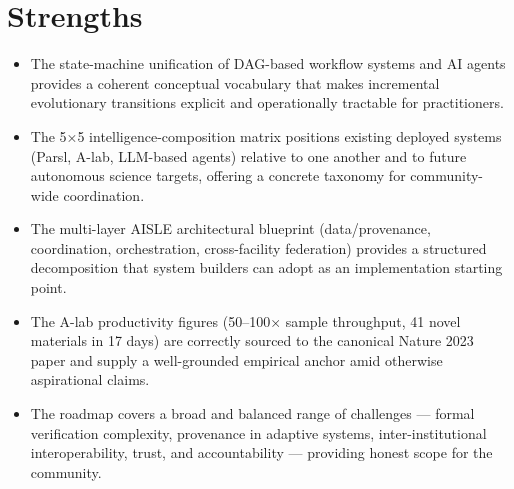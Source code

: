 \documentclass[11pt]{article}
\begin{document}
\section*{Strengths}
\begin{itemize}[leftmargin=*]
  \item The state-machine unification of DAG-based workflow systems and AI agents provides a coherent conceptual vocabulary that makes incremental evolutionary transitions explicit and operationally tractable for practitioners.
  \item The 5×5 intelligence-composition matrix positions existing deployed systems (Parsl, A-lab, LLM-based agents) relative to one another and to future autonomous science targets, offering a concrete taxonomy for community-wide coordination.
  \item The multi-layer AISLE architectural blueprint (data/provenance, coordination, orchestration, cross-facility federation) provides a structured decomposition that system builders can adopt as an implementation starting point.
  \item The A-lab productivity figures (50–100× sample throughput, 41 novel materials in 17 days) are correctly sourced to the canonical Nature 2023 paper and supply a well-grounded empirical anchor amid otherwise aspirational claims.
  \item The roadmap covers a broad and balanced range of challenges — formal verification complexity, provenance in adaptive systems, inter-institutional interoperability, trust, and accountability — providing honest scope for the community.
\end{itemize}
\end{document}
